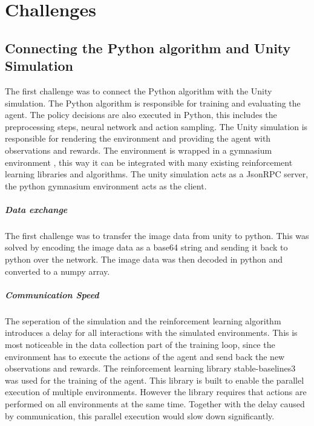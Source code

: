 \chapter{Challenges}
\label{cha:challenges}

\section{Connecting the Python algorithm and Unity Simulation}

The first challenge was to connect the Python algorithm with the Unity simulation. The Python algorithm is responsible for training and evaluating the agent. The policy decisions are also executed in Python, this includes the preprocessing steps, neural network and action sampling. The Unity simulation is responsible for rendering the environment and providing the agent with observations and rewards. The environment is wrapped in a gymnasium environment \autocite{gymnasium}, this way it can be integrated with many existing reinforcement learning libraries and algorithms. The unity simulation acts as a JsonRPC server, the python gymnasium environment acts as the client.

\paragraph{Data exchange}
The first challenge was to transfer the image data from unity to python. This was solved by encoding the image data as a base64 string and sending it back to python over the network. The image data was then decoded in python and converted to a numpy array.

\paragraph{Communication Speed}
The seperation of the simulation and the reinforcement learning algorithm introduces a delay for all interactions with the simulated environments. This is most noticeable in the data collection part of the training loop, since the environment has to execute the actions of the agent and send back the new observations and rewards. 
The reinforcement learning library stable-baselines3 \autocite{sb3} was used for the training of the agent. This library is built to enable the parallel execution of multiple environments. However the library requires that actions are performed on all environments at the same time. Together with the delay caused by communication, this parallel execution would slow down significantly.


